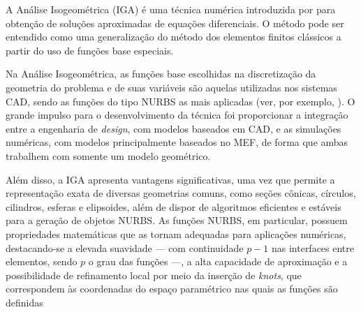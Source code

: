 \documentclass[tese_patricia]{subfiles}
\begin{document}


A Análise Isogeométrica (IGA) é uma técnica numérica introduzida por  para obtenção de soluções aproximadas de equações diferenciais. O método pode ser entendido como uma generalização do método dos elementos finitos clássicos a partir do uso de funções base especiais. 

Na Análise Isogeométrica, as funções base escolhidas na discretização da geometria do problema e de suas variáveis são aquelas utilizadas nos sistemas CAD, sendo as funções do tipo NURBS as mais aplicadas (ver, por exemplo, ). O grande impulso para o desenvolvimento da técnica foi proporcionar a integração entre a engenharia de \textit{design}, com modelos baseados em CAD, e as simulações numéricas, com modelos principalmente baseados no MEF, de forma que ambas trabalhem com somente um modelo geométrico.

Além disso, a IGA apresenta vantagens significativas, uma vez que permite a representação exata de diversas geometrias comuns, como seções cônicas, círculos, cilindros, esferas e elipsoides, além de dispor de algoritmos eficientes e estáveis para a geração de objetos NURBS. As funções NURBS, em particular, possuem propriedades matemáticas que as tornam adequadas para aplicações numéricas, destacando-se a elevada suavidade — com continuidade 
$p-1$  nas interfaces entre elementos, sendo $p$ o grau das funções —, a alta capacidade de aproximação e a possibilidade de refinamento local por meio da inserção de \textit{knots}, que correspondem às coordenadas do espaço paramétrico nas quais as funções são definidas
\end{document}
